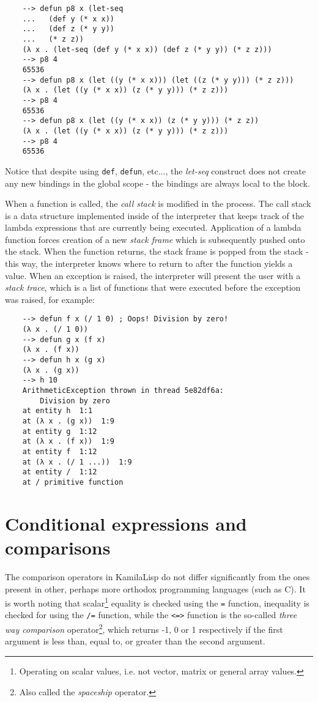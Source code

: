 \begin{Verbatim}
    --> defun p8 x (let-seq
    ...   (def y (* x x))
    ...   (def z (* y y))
    ...   (* z z))
    (λ x . (let-seq (def y (* x x)) (def z (* y y)) (* z z)))
    --> p8 4
    65536
    --> defun p8 x (let ((y (* x x))) (let ((z (* y y))) (* z z)))
    (λ x . (let ((y (* x x)) (z (* y y))) (* z z)))
    --> p8 4
    65536
    --> defun p8 x (let ((y (* x x)) (z (* y y))) (* z z))
    (λ x . (let ((y (* x x)) (z (* y y))) (* z z)))
    --> p8 4
    65536
\end{Verbatim}

Notice that despite using \verb|def|, \verb|defun|, etc..., the \textit{let-seq} construct does not create any new bindings in the global scope - the bindings are always local to the block.

When a function is called, the \textit{call stack} is modified in the process. The call stack is a data structure implemented inside of the interpreter that keeps track of the lambda expressions that are currently being executed. Application of a lambda function forces creation of a new \textit{stack frame} which is subsequently pushed onto the stack. When the function returns, the stack frame is popped from the stack - this way, the interpreter knows where to return to after the function yields a value. When an exception is raised, the interpreter will present the user with a \textit{stack trace}, which is a list of functions that were executed before the exception was raised, for example:

\begin{Verbatim}
    --> defun f x (/ 1 0) ; Oops! Division by zero!
    (λ x . (/ 1 0))
    --> defun g x (f x)
    (λ x . (f x))
    --> defun h x (g x)
    (λ x . (g x))
    --> h 10
    ArithmeticException thrown in thread 5e82df6a:
        Division by zero
    at entity h  1:1
    at (λ x . (g x))  1:9
    at entity g  1:12
    at (λ x . (f x))  1:9
    at entity f  1:12
    at (λ x . (/ 1 ...))  1:9
    at entity /  1:12
    at / primitive function
\end{Verbatim}

\section{Conditional expressions and comparisons}

The comparison operators in KamilaLisp do not differ significantly from the ones present in other, perhaps more orthodox programming languages (such as C). It is worth noting that scalar\footnote{Operating on scalar values, i.e. not vector, matrix or general array values.} equality is checked using the \verb|=| function, inequality is checked for using the \verb|/=| function, while the \verb|<=>| function is the so-called \textit{three way comparison} operator\footnote{Also called the \textit{spaceship} operator.}, which returns -1, 0 or 1 respectively if the first argument is less than, equal to, or greater than the second argument.

